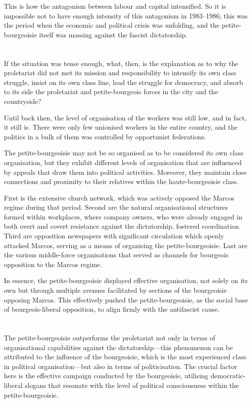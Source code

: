 This is how the antagonism between labour and capital intensified. 
So it is impossible not to have enough 
intensity of this antagonism in 1983--1986;
this was the period when the economic and political crisis was unfolding,
and the petite-bourgeoisie itself was massing against the fascist dictatorship.

\section{}
If the situation was tense enough, 
what, then, is the explanation as to 
why the proletariat did not met its mission and responsibility 
to intensify its own class struggle, 
insist on its own class line, 
lead the struggle for democracy, 
and absorb to its side 
the proletariat and petite-bourgeois forces 
in the city and the countryside?

Until back then, 
the level of organisation of the workers was still low, 
and in fact, it still is. 
There were only few unionised workers in the entire country,
and the politics in a bulk of them was controlled by opportunist federations.

The petite-bourgeoisie may not be so organised 
as to be considered its own class organisation,
but they exhibit different levels of organisation 
that are influenced by appeals 
that draw them into political activities. 
Moreover, 
they maintain close connections and proximity 
to their relatives within the haute-bourgeoisie class.

First is the extensive church network,
which was actively opposed the Marcos regime during that period. 
Second are the natural organisational structures 
formed within workplaces, 
where company owners, who were already engaged 
in both overt and covert resistance 
against the dictatorship, fostered coordination. 
Third are opposition newspapers 
with significant circulation which openly attacked Marcos, 
serving as a means of organising the petite-bourgeoisie. 
Last are the various middle-force organisations 
that served as channels 
for bourgeois opposition to the Marcos regime.

In essence, 
the petite-bourgeoisie displayed effective organisation, 
not solely on its own 
but through multiple avenues facilitated 
by sections of the bourgeoisie opposing Marcos. 
This effectively pushed the petite-bourgeoisie, 
as the social base of bourgeois-liberal opposition, 
to align firmly with the antifascist cause.


\section{}
The petite-bourgeoisie outperforms the proletariat 
not only in terms of organisational capabilities 
against the dictatorship---this 
phenomenon can be attributed 
to the influence of the bourgeoisie, 
which is the most experienced class in political organisation---but 
also in terms of politicisation. 
The crucial factor here 
is the effective campaign conducted by the bourgeoisie, 
utilising democratic-liberal slogans 
that resonate with the level of political consciousness 
within the petite-bourgeoisie.


